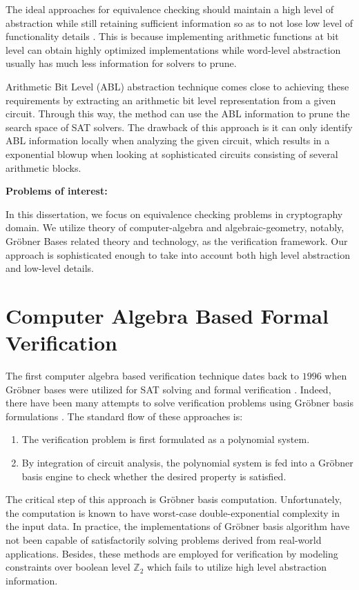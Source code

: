 The ideal approaches for equivalence checking should maintain a high level
of abstraction while still retaining sufficient information so as to
not lose low level of functionality details \cite{gupta_survey}. 
This is because implementing arithmetic functions at bit level can obtain highly optimized implementations
while word-level abstraction usually has much less information for solvers to prune.

Arithmetic Bit Level (ABL) abstraction technique comes close to achieving these requirements 
by extracting an arithmetic bit level representation from a given circuit. 
Through this way, the method can use the ABL information
to prune the search space of SAT solvers. 
The drawback of this approach is it can only identify ABL information locally when
analyzing the given circuit, which results in a exponential blowup when looking at sophisticated
circuits consisting of several arithmetic blocks.

{\bf Problems of interest:}

In this dissertation, we focus on equivalence checking problems in cryptography domain.
We utilize theory of computer-algebra and algebraic-geometry, notably, Gr\"obner Bases
related theory and technology, as the verification framework.
Our approach is sophisticated enough to take into account both high level abstraction and low-level details. 

\section{Computer Algebra Based Formal Verification}

The first computer algebra based verification technique dates back to $1996$ 
when Gr\"{o}bner bases were utilized for SAT solving and formal verification \cite{CEI:stoc-96}.
Indeed, there have been many attempts to solve verification problems using Gr\"obner basis formulations 
\cite{Avrunin:CAV} \cite{condrat-tacas07} \cite{gbverify:2007}.
The standard flow of these approaches is:
\begin{enumerate}
	\item The verification problem is first formulated as a polynomial system.
	\item By integration of circuit analysis, the polynomial system is 
	fed into a Gr\"obner basis engine to check whether the desired property is satisfied.
\end{enumerate}
 
The critical step of this approach is Gr\"obner basis computation. 
Unfortunately, the computation is known to have worst-case double-exponential complexity in the input data.
In practice, the implementations of Gr\"obner basis algorithm have not been capable of satisfactorily
solving problems derived from real-world applications.
Besides, these methods are employed for verification by modeling constraints over boolean level 
$\mathbb{Z}_2$ which fails to utilize high level abstraction information.

